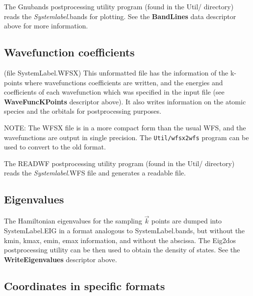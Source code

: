 \documentclass[11pt]{article}
\begin{document}
\noindent
The {\sc Gnubands} postprocessing utility
program (found in the Util/ directory) reads the {\it Systemlabel}.bands
for plotting.
See the {\bf BandLines} data descriptor above for more information.

\subsection{Wavefunction coefficients}\label{subsec:wf}
(file SystemLabel.WFSX) This unformatted file has the
information of the k-points where wavefunctions coefficients
are written, and the energies and coefficients of each
wavefunction which was specified in the input file
(see {\bf WaveFuncKPoints}
descriptor above).
It also writes information on the atomic species and
the orbitals for postprocessing purposes.

NOTE: The WFSX file is in a more compact form than the usual WFS, and the
wavefunctions are output in single precision. The {\tt Util/wfsx2wfs}
program can be used to convert to the old format.


\noindent
The READWF postprocessing utility
program (found in the Util/ directory) reads the {\it Systemlabel}.WFS
file and generates a readable file.

\subsection{Eigenvalues}

The Hamiltonian eigenvalues for the sampling $\vec k$ points are
dumped into SystemLabel.EIG in a format analogous to SystemLabel.bands,
but without the kmin, kmax, emin, emax information, and without
the abscissa. The {\sc Eig2dos}
postprocessing utility can be then used to obtain the density of
states. 
See the {\bf WriteEigenvalues} descriptor above.


\subsection{Coordinates in specific formats}
\end{document}
